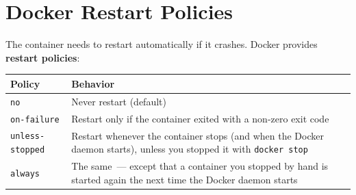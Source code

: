 \setcounter{section}{5}
\section{Docker Restart Policies}\label{24-process-startup:246-docker-restart-policies}

The container needs to restart automatically if it crashes. Docker provides \textbf{restart policies}:


{\def\LTcaptype{none} %
\begin{longtable}[]{@{}
  >{\raggedright\arraybackslash}p{}
  >{\raggedright\arraybackslash}p{}@{}}
\toprule\noalign{}
\begin{minipage}[b]{\linewidth}\raggedright
Policy
\end{minipage} & \begin{minipage}[b]{\linewidth}\raggedright
Behavior
\end{minipage} \\
\midrule\noalign{}
\endhead
\bottomrule\noalign{}
\endlastfoot
\texttt{no} & Never restart (default) \\
\texttt{on-failure} & Restart only if the container exited with a non-zero exit code \\
\texttt{unless-stopped} & Restart whenever the container stops (and when the Docker daemon starts), unless you stopped it with \texttt{docker\ stop} \\
\texttt{always} & The same~--- except that a container you stopped by hand is started again the next time the Docker daemon starts \\
\end{longtable}
}

\begin{codebox}[short]

\begin{Shaded}
\begin{Highlighting}[]
 \DataTypeTok{\textbackslash{}}
    \DataTypeTok{\textbackslash{}}
    \DataTypeTok{\textbackslash{}}
    \DataTypeTok{\textbackslash{}}
    \DataTypeTok{\textbackslash{}}
    \DataTypeTok{\textbackslash{}}
\end{Highlighting}
\end{Shaded}

\end{codebox}

